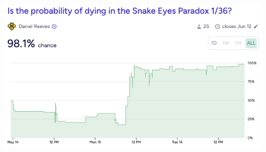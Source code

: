 \documentclass[article,twocolumn]{memoir}
\begin{document}
\vspace{2em}

\noindent
\includegraphics[width=\linewidth]{manifold-snakeeyes}

\end{document}
